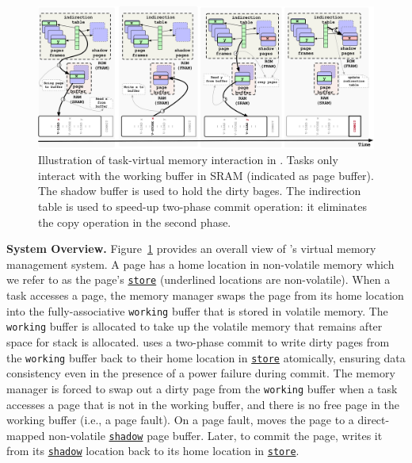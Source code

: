 \begin{figure}
	\centering
	\includegraphics[width=\textwidth]{figures/graffle/paging.pdf}
	\caption{Illustration of task-virtual memory interaction in \sys. Tasks only interact with the working buffer in SRAM (indicated as page buffer). The shadow buffer is used to hold the dirty bages. The indirection table is used to speed-up two-phase commit operation: it eliminates the copy operation in the second phase.}
	\label{figure:coala_page_tags}
\end{figure}

\textbf{System Overview.} Figure~\ref{figure:coala_page_tags} provides an
overall view of \sys's virtual memory management system.  A page has a home
location in non-volatile memory which we refer to as the page's
\texttt{\underline{store}} (underlined locations are non-volatile).  When a
task accesses a page, the memory manager swaps the page from its home location
into the fully\hyp{}associative \texttt{working} buffer that is stored in
volatile memory.  The \texttt{working} buffer is allocated to take up the
volatile memory that remains after space for stack is allocated.
%
\sys uses a two-phase commit to write dirty pages from the \texttt{working}
buffer back to their home location in \texttt{\underline{store}} atomically,
ensuring data consistency even in the presence of a power failure during commit.
%
The memory manager is forced to swap out a dirty page from the \texttt{working} buffer 
when a task accesses a page that is not in the working buffer, and there is no
free page in the working buffer (i.e., a page fault). On a page fault, \sys
moves the page to a direct\hyp{}mapped non-volatile \texttt{\underline{shadow}}
page buffer. Later, to commit the page, \sys writes it from its
\texttt{\underline{shadow}} location back to its home location in
\texttt{\underline{store}}.
%
%

